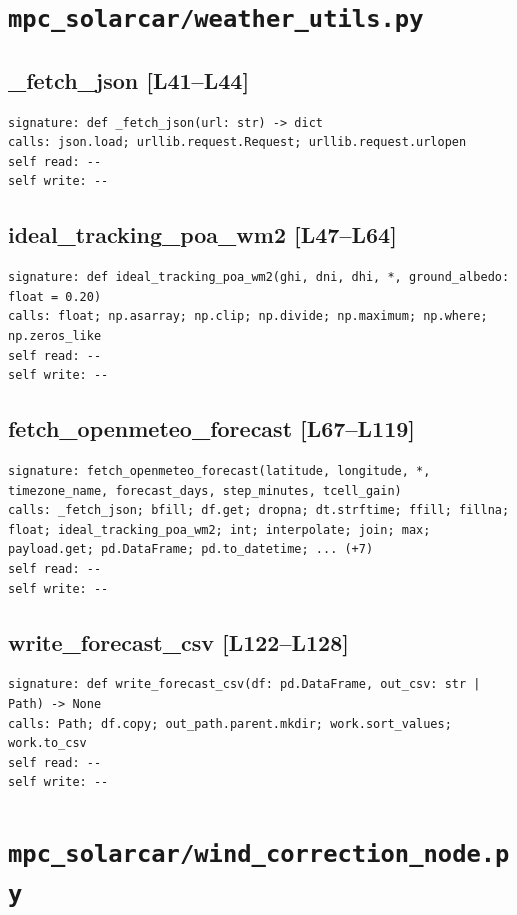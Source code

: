 \documentclass[a4paper,10pt,oneside]{book}
\begin{document}
\section{\texttt{mpc\_solarcar/weather\_utils.py}}
\subsection*{\_fetch\_json [L41--L44]}
\begin{lstlisting}[numbers=none]
signature: def _fetch_json(url: str) -> dict
calls: json.load; urllib.request.Request; urllib.request.urlopen
self read: --
self write: --
\end{lstlisting}
\subsection*{ideal\_tracking\_poa\_wm2 [L47--L64]}
\begin{lstlisting}[numbers=none]
signature: def ideal_tracking_poa_wm2(ghi, dni, dhi, *, ground_albedo: float = 0.20)
calls: float; np.asarray; np.clip; np.divide; np.maximum; np.where; np.zeros_like
self read: --
self write: --
\end{lstlisting}
\subsection*{fetch\_openmeteo\_forecast [L67--L119]}
\begin{lstlisting}[numbers=none]
signature: fetch_openmeteo_forecast(latitude, longitude, *, timezone_name, forecast_days, step_minutes, tcell_gain)
calls: _fetch_json; bfill; df.get; dropna; dt.strftime; ffill; fillna; float; ideal_tracking_poa_wm2; int; interpolate; join; max; payload.get; pd.DataFrame; pd.to_datetime; ... (+7)
self read: --
self write: --
\end{lstlisting}
\subsection*{write\_forecast\_csv [L122--L128]}
\begin{lstlisting}[numbers=none]
signature: def write_forecast_csv(df: pd.DataFrame, out_csv: str | Path) -> None
calls: Path; df.copy; out_path.parent.mkdir; work.sort_values; work.to_csv
self read: --
self write: --
\end{lstlisting}
\section{\texttt{mpc\_solarcar/wind\_correction\_node.py}}
\end{document}
